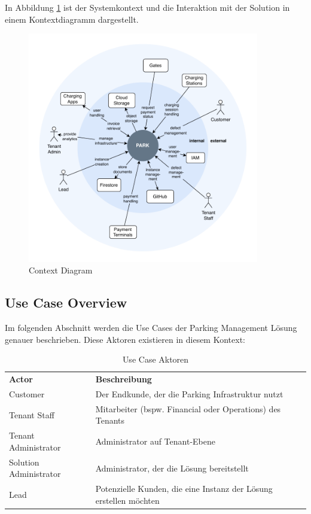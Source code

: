 In Abbildung \ref{fig:context-diagram} ist der Systemkontext und die Interaktion mit der Solution in einem Kontextdiagramm dargestellt.

\begin{figure}[H]
    \centering
    \includegraphics[width=0.9\textwidth]{resources/context-diagram.pdf}
    \caption{Context Diagram}
    \label{fig:context-diagram}
\end{figure}


\subsection{Use Case Overview}
Im folgenden Abschnitt werden die Use Cases der Parking Management Lösung genauer beschrieben. Diese Aktoren existieren in diesem Kontext:

\renewcommand{\arraystretch}{1.5}
{
\begin{longtable}{l p{10cm}}
    \caption{Use Case Aktoren}
    \label{tab:use-case-actors} \\
    \textbf{Actor} & \textbf{Beschreibung} \\ [1ex]
    Customer & Der Endkunde, der die Parking Infrastruktur nutzt \\ [0.5ex]
    Tenant Staff & Mitarbeiter (bspw. Financial oder Operations) des Tenants \\ [0.5ex]
    Tenant Administrator & Administrator auf Tenant-Ebene \\ [0.5ex]
    Solution Administrator & Administrator, der die Lösung bereitstellt \\ [0.5ex]
    Lead & Potenzielle Kunden, die eine Instanz der Lösung erstellen möchten \\ 
\end{longtable}}

